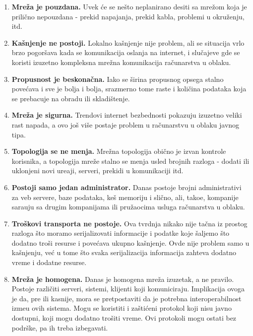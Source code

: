 \begin{enumerate}[start=1,label={(\bfseries \arabic*)}]
	\item \textbf{Mre\v za je pouzdana.} Uvek \'ce se ne\v sto neplanirano desiti sa mre\v zom koja je prili\v cno nepouzdana - prekid napajanja, prekid kabla, problemi u okru\v zenju, itd.
	\item \textbf{Ka\v snjenje ne postoji.} Lokalno ka\v snjenje nije problem, ali se situacija vrlo brzo pogor\v sava kada se komunikacija oslanja na internet, i slu\v cajeve gde se koristi izuzetno kompleksna mre\v zna komunikacija ra\v cunarstva u oblaku.
	\item \textbf{Propusnost je beskona\v cna.} Iako se \v sirina propusnog opsega stalno pove\'cava i sve je bolja i bolja, srazmerno tome raste i koli\v cina podataka koja se prebacuje na obradu ili skladi\v stenje.
	\item \textbf{Mre\v za je sigurna.} Trendovi internet bezbednosti pokazuju izuzetno veliki rast napada, a ovo jo\v s vi\v se postaje problem u ra\v cunarstvu u oblaku javnog tipa.
	\item \textbf{Topologija se ne menja.} Mre\v zna topologija obi\v cno je izvan kontrole korisnika, a topologija mre\v ze stalno se menja usled brojnih razloga - dodati ili uklonjeni novi ure\dj aji, serveri, prekidi u komunikaciji itd.
	\item \textbf{Postoji samo jedan administrator.} Danas postoje brojni administrativi za veb servere, baze podataka, ke\v s memoriju i sli\v cno, ali, tako\dj e, kompanije sara\dj uju sa drugim kompanijama ili pru\v zaocima usluga ra\v cunarstva u oblaku.
	\item \textbf{Tro\v skovi transporta ne postoje.} Ova tvrdnja nikako nije ta\v cna iz prostog razloga \v sto moramo serijalizovati informacije i podatke koje \v saljemo \v sto dodatno tro\v si resurse i pove\'cava ukupno ka\v snjenje. Ovde nije problem samo u ka\v snjenju, ve\'c u tome \v sto svaka serijalizacija informacija zahteva dodatno vreme i dodatne resurse.
	\item \textbf{Mre\v za je homogena.} Danas je homogena mre\v za izuzetak, a ne pravilo. Postoje razli\v citi serveri, sistemi, klijenti koji komuniciraju. Implikacija ovoga je da, pre ili kasnije, mora se pretpostaviti da je potrebna interoperabilnost izme\dj u ovih sistema. Mogu se koristiti i za\v sti\'ceni protokol koji nisu javno dostupni, koji mogu dodatno tro\v siti vreme. Ovi protokoli mogu ostati bez podr\v ske, pa ih treba izbegavati.
\end{enumerate}


